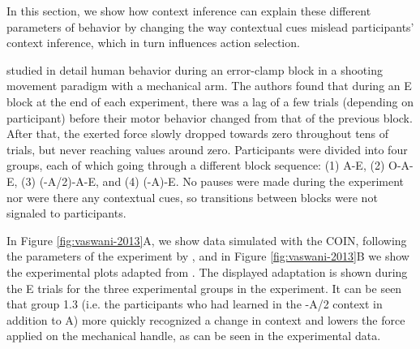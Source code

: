 \documentclass[a4paper,doc,floatsintext,natbib]{apa6}%
\def \fref #1{Figure \ref{#1}}     %
\begin{document}
In this section, we show how context inference can explain these different parameters of behavior by changing the way contextual cues mislead participants' context inference, which in turn influences action selection.

\cite{Vaswani_Decay_2013} studied in detail human behavior during an error-clamp block in a shooting movement paradigm with a mechanical arm. The authors found that during an E block at the end of each experiment, there was a lag of a few trials (depending on participant) before their motor behavior changed from that of the previous block. After that, the exerted force slowly dropped towards zero throughout tens of trials, but never reaching values around zero. Participants were divided into four groups, each of which going through a different block sequence: (1) A-E, (2) O-A-E, (3) (-A/2)-A-E, and (4) (-A)-E. No pauses were made during the experiment nor were there any contextual cues, so transitions between blocks were not signaled to participants.

In \fref{fig:vaswani-2013}A, we show data simulated with the COIN, following the parameters of the experiment by \cite{Vaswani_Decay_2013}, and in \fref{fig:vaswani-2013}B we show the experimental plots adapted from \cite{Vaswani_Decay_2013}. The displayed adaptation is shown during the E trials for the three experimental groups in the experiment. It can be seen that group 1.3 (i.e. the participants who had learned in the -A/2 context in addition to A) more quickly recognized a change in context and lowers the force applied on the mechanical handle, as can be seen in the experimental data.
\end{document}
